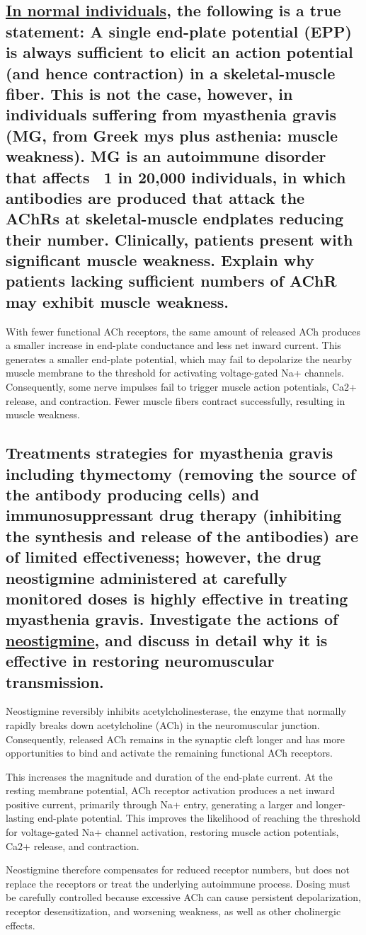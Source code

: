 \documentclass{article}
\begin{document}
\subsection{
\underline{In normal individuals}, the following is a true statement: A single end-plate potential (EPP)
is always sufficient to elicit an action potential (and hence contraction) in a skeletal-muscle
fiber. This is not the case, however, in individuals suffering from myasthenia gravis (MG,
from Greek mys plus asthenia: muscle weakness). MG is an autoimmune disorder that
affects ~1 in 20,000 individuals, in which antibodies are produced that attack the AChRs at
skeletal-muscle endplates reducing their number. Clinically, patients present with significant
muscle weakness. Explain why patients lacking sufficient numbers of AChR may exhibit
muscle weakness.
}
With fewer functional ACh receptors, the same amount of released ACh produces a smaller increase in end-plate conductance and less net inward current.
This generates a smaller end-plate potential, which may fail to depolarize the nearby muscle membrane to the threshold for activating voltage-gated Na+ channels.
Consequently, some nerve impulses fail to trigger muscle action potentials, Ca2+ release, and contraction.
Fewer muscle fibers contract successfully, resulting in muscle weakness.

\subsection{
Treatments strategies for myasthenia gravis including thymectomy (removing the source of
the antibody producing cells) and immunosuppressant drug therapy (inhibiting the
synthesis and release of the antibodies) are of limited effectiveness; however, the drug
neostigmine administered at carefully monitored doses is highly effective in treating
myasthenia gravis. Investigate the actions of \underline{neostigmine}, and discuss in detail why it is
effective in restoring neuromuscular transmission.
}
Neostigmine reversibly inhibits acetylcholinesterase, the enzyme that normally rapidly breaks down acetylcholine (ACh) in the neuromuscular junction.
Consequently, released ACh remains in the synaptic cleft longer and has more opportunities to bind and activate the remaining functional ACh receptors.

This increases the magnitude and duration of the end-plate current.
At the resting membrane potential, ACh receptor activation produces a net inward positive current, primarily through Na+ entry, generating a larger and longer-lasting end-plate potential.
This improves the likelihood of reaching the threshold for voltage-gated Na+ channel activation, restoring muscle action potentials, Ca2+ release, and contraction.

Neostigmine therefore compensates for reduced receptor numbers, but does not replace the receptors or treat the underlying autoimmune process.
Dosing must be carefully controlled because excessive ACh can cause persistent depolarization, receptor desensitization, and worsening weakness, as well as other cholinergic effects.
\end{document}
